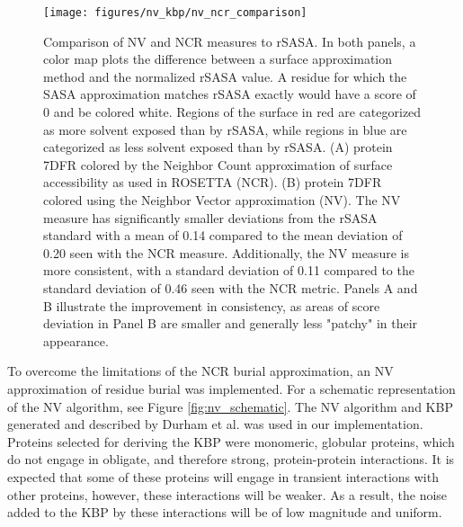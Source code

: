 \begin{figure}
\centering
\texttt{[image: figures/nv\_kbp/nv\_ncr\_comparison]}
\caption{
Comparison of NV and NCR measures to rSASA.
In both panels, a color map plots the difference between a surface approximation method and the normalized rSASA value.
A residue for which the SASA approximation matches rSASA exactly would have a score of 0 and be colored white.
Regions of the surface in red are categorized as more solvent exposed than by rSASA, while regions in blue are categorized as less solvent exposed than by rSASA.
(A) protein 7DFR colored by the Neighbor Count approximation of surface accessibility as used in ROSETTA (NCR).
(B) protein 7DFR colored using the Neighbor Vector approximation (NV).
The NV measure has significantly smaller deviations from the rSASA standard with a mean of 0.14 compared to the mean deviation of 0.20 seen with the NCR measure.
Additionally, the NV measure is more consistent, with a standard deviation of 0.11 compared to the standard deviation of 0.46 seen with the NCR metric.
Panels A and B illustrate the improvement in consistency, as areas of score deviation in Panel B are smaller and generally less "patchy" in their appearance.
}
\label{fig:nv_ncr_comparison}
\end{figure}

To overcome the limitations of the NCR burial approximation, an NV approximation of residue burial was implemented.
For a schematic representation of the NV algorithm, see Figure \ref{fig:nv_schematic}.
The NV algorithm and KBP generated and described by Durham et al\citep{Durham:2009kt}.
was used in our implementation.
Proteins selected for deriving the KBP were monomeric, globular proteins, which do not engage in obligate, and therefore strong, protein-protein interactions.
It is expected that some of these proteins will engage in transient interactions with other proteins, however, these interactions will be weaker.
As a result, the noise added to the KBP by these interactions will be of low magnitude and uniform.

